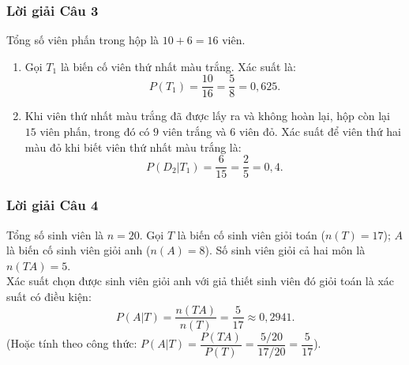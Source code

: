 \documentclass[12pt,a4paper]{article}
\theoremstyle{definition}
\begin{document}
\subsubsection*{Lời giải Câu 3}
Tổng số viên phấn trong hộp là $10 + 6 = 16$ viên.
\begin{enumerate}[label=\arabic*.]
    \item Gọi $T_1$ là biến cố viên thứ nhất màu trắng. Xác suất là:
    \[
    P(T_1) = \frac{10}{16} = \frac{5}{8} = 0{,}625.
    \]
    \item Khi viên thứ nhất màu trắng đã được lấy ra và không hoàn lại, hộp còn lại $15$ viên phấn, trong đó có $9$ viên trắng và $6$ viên đỏ.
    Xác suất để viên thứ hai màu đỏ khi biết viên thứ nhất màu trắng là:
    \[
    P(D_2|T_1) = \frac{6}{15} = \frac{2}{5} = 0{,}4.
    \]
\end{enumerate}

\subsubsection*{Lời giải Câu 4}
Tổng số sinh viên là $n = 20$.
Gọi $T$ là biến cố sinh viên giỏi toán ($n(T) = 17$); $A$ là biến cố sinh viên giỏi anh ($n(A) = 8$).
Số sinh viên giỏi cả hai môn là $n(TA) = 5$.\\
Xác suất chọn được sinh viên giỏi anh với giả thiết sinh viên đó giỏi toán là xác suất có điều kiện:
\[
P(A|T) = \frac{n(TA)}{n(T)} = \frac{5}{17} \approx 0{,}2941.
\]
(Hoặc tính theo công thức: $P(A|T) = \dfrac{P(TA)}{P(T)} = \dfrac{5/20}{17/20} = \dfrac{5}{17}$).
\end{document}
